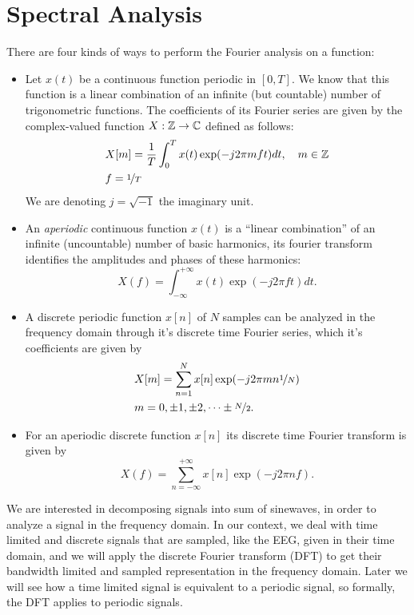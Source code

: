 \documentclass[10pt, letterpaper]{report}
\begin{document}
\section{Spectral Analysis}
There are four kinds of ways to perform the Fourier analysis on a function:\begin{itemize}
     \item Let $x(t)$  be a continuous function periodic in $[0,T]$. We know that this function is a linear combination of an infinite (but countable) number of trigonometric functions.
     The coefficients of its Fourier series are given by the complex-valued function $X:{\mathbb Z}\rightarrow{\mathbb C}$  defined as follows: \begin{align}
          &X[m]=\frac{1}{T}\int_{0}^{T}x(t)\exp(-j2\pi mft)dt, \ \ \ m\in \Z\\ 
          &f=\nicefrac{1}{T}
     \end{align}
     We are denoting $j=\sqrt{-1}$ the imaginary unit.
     \item An \textit{aperiodic} continuous function $x(t)$ is a ``linear combination'' of an infinite (uncountable) number of basic harmonics, its fourier transform identifies the amplitudes and phases of these harmonics:\begin{equation}
          X(f)=\int_{-\infty}^{+\infty}x(t)\exp(-j2\pi ft)dt.
     \end{equation}
     \item A discrete periodic function $x[n]$ of $N$ samples can be analyzed in the frequency domain through it's discrete time Fourier series, which it's coefficients are given by\begin{align}
          &X[m]=\sum_{n=1}^N x[n]\exp(-j2\pi m n \nicefrac{1}{N})\\ 
          &m=0,\pm 1, \pm 2,\dots \pm \nicefrac{N}{2}.
     \end{align}
     \item For an aperiodic discrete function $x[n]$ its discrete time Fourier transform is given by\begin{equation}
          X(f)=\sum_{n=-\infty}^{+\infty}x[n]\exp(-j2\pi nf ).
     \end{equation}
\end{itemize}
We are interested in decomposing signals into sum of sinewaves, in order to analyze a signal in the frequency domain. In our context, we deal with time limited and discrete signals that are sampled, like the EEG,  given in their time domain, and we will apply the discrete Fourier transform (DFT) to get their bandwidth limited and sampled representation in the frequency domain. Later we will see how a time limited signal is equivalent to a periodic signal, so formally, the DFT applies to periodic signals.
\end{document}
